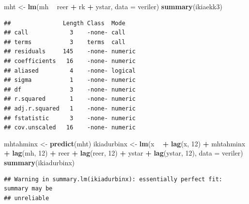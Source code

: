\documentclass[]{article}
\newenvironment{Shaded}{\begin{snugshade}}{\end{snugshade}}
\newcommand{\KeywordTok}[1]{\textcolor[rgb]{0.13,0.29,0.53}{\textbf{#1}}}
\newcommand{\DataTypeTok}[1]{\textcolor[rgb]{0.13,0.29,0.53}{#1}}
\newcommand{\DecValTok}[1]{\textcolor[rgb]{0.00,0.00,0.81}{#1}}
\newcommand{\StringTok}[1]{\textcolor[rgb]{0.31,0.60,0.02}{#1}}
\newcommand{\OperatorTok}[1]{\textcolor[rgb]{0.81,0.36,0.00}{\textbf{#1}}}
\newcommand{\NormalTok}[1]{#1}
\begin{document}
\begin{Shaded}
\begin{Highlighting}[]
\NormalTok{mht <-}\StringTok{ }\KeywordTok{lm}\NormalTok{(mh }\OperatorTok{~}\StringTok{ }\NormalTok{reer }\OperatorTok{+}\StringTok{ }\NormalTok{rk }\OperatorTok{+}\StringTok{ }\NormalTok{ystar, }\DataTypeTok{data =}\NormalTok{ veriler)}
\KeywordTok{summary}\NormalTok{(ikiaekk3)}
\end{Highlighting}
\end{Shaded}

\begin{verbatim}
##               Length Class  Mode   
## call            3    -none- call   
## terms           3    terms  call   
## residuals     145    -none- numeric
## coefficients   16    -none- numeric
## aliased         4    -none- logical
## sigma           1    -none- numeric
## df              3    -none- numeric
## r.squared       1    -none- numeric
## adj.r.squared   1    -none- numeric
## fstatistic      3    -none- numeric
## cov.unscaled   16    -none- numeric
\end{verbatim}

\begin{Shaded}
\begin{Highlighting}[]
\NormalTok{mhtahminx <-}\StringTok{ }\KeywordTok{predict}\NormalTok{(mht)}
\NormalTok{ikiadurbinx <-}\StringTok{ }\KeywordTok{lm}\NormalTok{(x }\OperatorTok{~}\StringTok{ }\OperatorTok{+}\StringTok{ }\KeywordTok{lag}\NormalTok{(x, }\DecValTok{12}\NormalTok{) }\OperatorTok{+}\StringTok{ }\NormalTok{mhtahminx }\OperatorTok{+}\StringTok{ }\KeywordTok{lag}\NormalTok{(mh, }\DecValTok{12}\NormalTok{) }\OperatorTok{+}\StringTok{ }\NormalTok{reer }\OperatorTok{+}\StringTok{ }\KeywordTok{lag}\NormalTok{(reer, }\DecValTok{12}\NormalTok{) }\OperatorTok{+}\StringTok{ }\NormalTok{ystar }\OperatorTok{+}\StringTok{ }\KeywordTok{lag}\NormalTok{(ystar, }\DecValTok{12}\NormalTok{), }\DataTypeTok{data =}\NormalTok{ veriler)}
\KeywordTok{summary}\NormalTok{(ikiadurbinx)}
\end{Highlighting}
\end{Shaded}

\begin{verbatim}
## Warning in summary.lm(ikiadurbinx): essentially perfect fit: summary may be
## unreliable
\end{verbatim}
\end{document}
